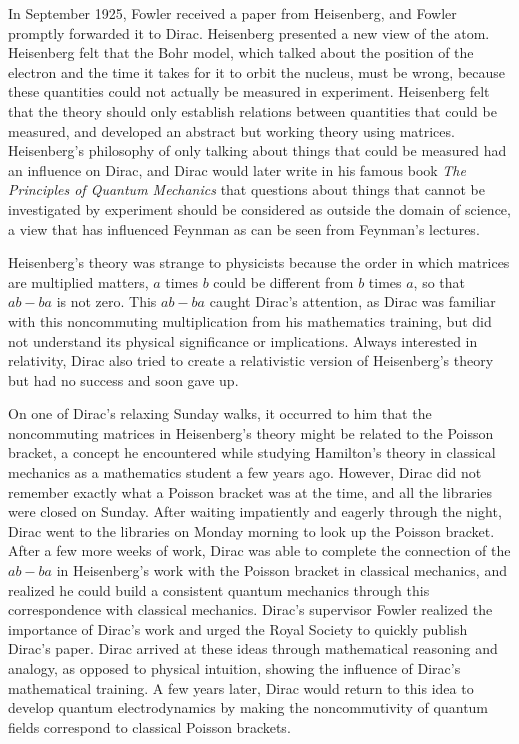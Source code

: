 \documentclass[12pt, oneside, letterpaper, fleqn]{article}
\begin{document}
In September 1925, Fowler received a paper from Heisenberg, and Fowler
promptly forwarded it to Dirac. Heisenberg presented a new view of the
atom. Heisenberg felt that the Bohr model, which talked about the
position of the electron and the time it takes for it to orbit the
nucleus, must be wrong, because these quantities could not actually be
measured in experiment. Heisenberg felt that the theory should only
establish relations between quantities that could be measured, and
developed an abstract but working theory using matrices. Heisenberg's
philosophy of only talking about things that could be measured had an
influence on Dirac, and Dirac would later write in his famous book
\textit{The Principles of Quantum Mechanics} \cite{principles} that
questions about things that cannot be investigated by experiment should
be considered as outside the domain of science, a view that has
influenced Feynman as can be seen from Feynman's lectures.

Heisenberg's theory was strange to physicists because the order in which
matrices are multiplied matters, $a$ times $b$ could be different from
$b$ times $a$, so that $ab - ba$ is not zero. This $ab - ba$ caught
Dirac's attention, as Dirac was familiar with this noncommuting
multiplication from his mathematics training, but did not understand its
physical significance or implications. Always interested in relativity,
Dirac also tried to create a relativistic version of Heisenberg's theory
but had no success and soon gave up.

On one of Dirac's relaxing Sunday walks, it occurred to him that the
noncommuting matrices in Heisenberg's theory might be related to the
Poisson bracket, a concept he encountered while studying Hamilton's
theory in classical mechanics as a mathematics student a few years ago.
However, Dirac did not remember exactly what a Poisson bracket was at
the time, and all the libraries were closed on Sunday. After waiting
impatiently and eagerly through the night, Dirac went to the libraries
on Monday morning to look up the Poisson bracket. After a few more weeks
of work, Dirac was able to complete the connection of the $ab - ba$ in
Heisenberg's work with the Poisson bracket in classical mechanics, and
realized he could build a consistent quantum mechanics through this
correspondence with classical mechanics. Dirac's supervisor Fowler
realized the importance of Dirac's work and urged the Royal Society to
quickly publish Dirac's paper. Dirac arrived at these ideas through
mathematical reasoning and analogy, as opposed to physical intuition,
showing the influence of Dirac's mathematical training. A few years
later, Dirac would return to this idea to develop quantum
electrodynamics by making the noncommutivity of quantum fields
correspond to classical Poisson brackets.
\end{document}
